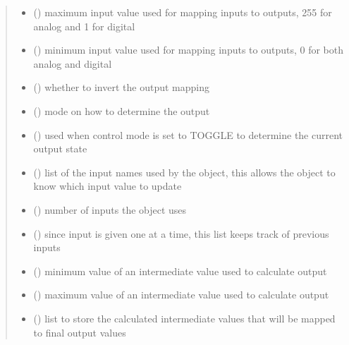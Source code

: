 \documentclass[letterpaper,10pt,english]{sphinxmanual}
\begin{document}
\begin{fulllineitems}
\begin{quote}
\begin{description}
\begin{itemize}
\item {} 
\sphinxAtStartPar
{}() \textendash{} maximum input value used for mapping 
inputs to outputs, 255 for analog and 1 for digital

\item {} 
\sphinxAtStartPar
{}() \textendash{} minimum input value used for mapping 
inputs to outputs, 0 for both analog and digital

\item {} 
\sphinxAtStartPar
{}(\sphinxstyleemphasis{{[}Boolean{]}}) \textendash{} whether to invert the output 
mapping

\item {} 
\sphinxAtStartPar
{}() \textendash{} mode on how to determine 
the output

\item {} 
\sphinxAtStartPar
{}() \textendash{} used when control mode 
is set to TOGGLE to determine the current output state

\item {} 
\sphinxAtStartPar
{}(\sphinxstyleemphasis{{[}str{]}}) \textendash{} list of the input names used by 
the object, this allows the object to know which input value to 
update

\item {} 
\sphinxAtStartPar
{}() \textendash{} number of inputs the object uses

\item {} 
\sphinxAtStartPar
{}(\sphinxstyleemphasis{{[}int{]}}) \textendash{} since input is given one at a 
time, this list keeps track of previous inputs

\item {} 
\sphinxAtStartPar
{}() \textendash{} minimum value of an intermediate 
value used to calculate output

\item {} 
\sphinxAtStartPar
{}() \textendash{} maximum value of an intermediate 
value used to calculate output

\item {} 
\sphinxAtStartPar
{}(\sphinxstyleemphasis{{[}int{]}}) \textendash{} list to store the calculated 
intermediate values that will be mapped to final output values


\end{itemize}
\end{description}
\end{quote}
\end{fulllineitems}
\end{document}
